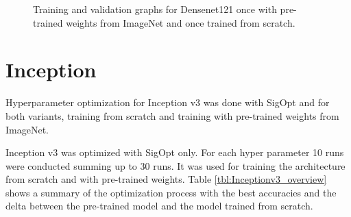 \begin{figure}[!h]
\centering
\caption{Training and validation graphs for Densenet121 once with pre-trained weights from ImageNet and once trained from scratch.}
\label{fig:densenet121-graph}
\end{figure}

\quad










\section{Inception}


Hyperparameter optimization for Inception v3 was done with SigOpt and for both variants, training from scratch and training with pre-trained weights from ImageNet.

Inception v3 was optimized with SigOpt only. For each hyper parameter 10 runs were conducted summing up to 30 runs. It was used for training the architecture from scratch and with pre-trained weights. Table \ref{tbl:Inceptionv3_overview} shows a summary of the optimization process with the best accuracies and the delta between the pre-trained model and the model trained from scratch. \\


